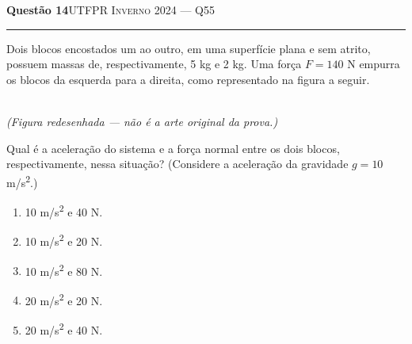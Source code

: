 \documentclass[11pt,a4paper]{article}
\newcommand{\fonte}[1]{{\small\scshape\color{grafite}#1}}
\newenvironment{questao}[2]{%
  \needspace{6\baselineskip}
  \par\addvspace{1.6em}
  {\large\bfseries\color{vinho}Quest\~ao #1}\hfill #2\\[-0.55em]
  {\color{black!25}\rule{\linewidth}{0.4pt}}
  \par\nobreak\smallskip
}{\par\addvspace{0.4em}}
\begin{document}
\begin{questao}{14}{\fonte{UTFPR Inverno 2024 --- Q55}}
Dois blocos encostados um ao outro, em uma superf\'icie plana e sem
atrito, possuem massas de, respectivamente, 5 kg e 2 kg. Uma for\c{c}a
$F = 140$ N empurra os blocos da esquerda para a direita, como
representado na figura a seguir.

\begin{center}
\\
{\small\itshape (Figura redesenhada --- n\~ao \'e a arte original da
prova.)}
\end{center}

Qual \'e a acelera\c{c}\~ao do sistema e a for\c{c}a normal entre os
dois blocos, respectivamente, nessa situa\c{c}\~ao? (Considere a
acelera\c{c}\~ao da gravidade $g = 10$ m/s\textsuperscript{2}.)
\begin{enumerate}
  \item 10 m/s\textsuperscript{2} e 40 N.
  \item 10 m/s\textsuperscript{2} e 20 N.
  \item 10 m/s\textsuperscript{2} e 80 N.
  \item 20 m/s\textsuperscript{2} e 20 N.
  \item 20 m/s\textsuperscript{2} e 40 N.
\end{enumerate}
\end{questao}
\end{document}
